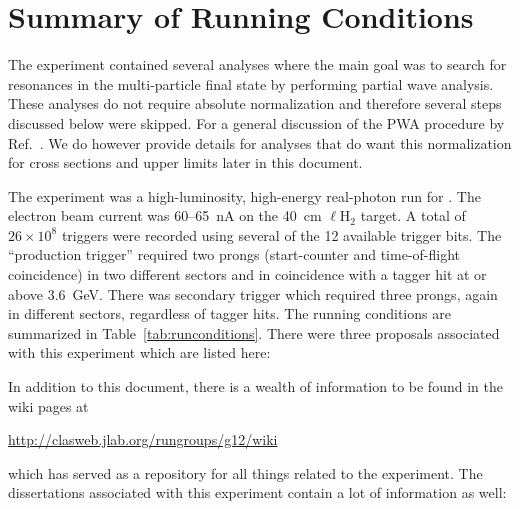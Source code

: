 \section{Summary of Running Conditions}

The  experiment contained several analyses where the main goal was to search for resonances in the multi-particle final state by performing partial wave analysis. These analyses\cite{clas.thesis.bookwalter, clas.thesis.schott} do not require absolute normalization and therefore several steps discussed below were skipped. For a general discussion of the PWA procedure by  Ref.~\cite{pwa.salgado2014}. We do however provide details for analyses that do want this normalization for cross sections and upper limits later in this document.

The  experiment was a high-luminosity, high-energy real-photon run for . The electron beam current was 60--65~nA on the 40~cm $\ell$H$_2$ target. A total of $26\times 10^8$ triggers were recorded using several of the 12 available trigger bits. The ``production trigger'' required two prongs (start-counter and time-of-flight coincidence) in two different sectors and in coincidence with a tagger hit at or above 3.6~GeV. There was secondary trigger which required three prongs, again in different sectors, regardless of tagger hits. The running conditions are summarized in Table~\ref{tab:runconditions}. There were three proposals associated with this experiment which are listed here:

In addition to this document, there is a wealth of information to be found in the wiki pages at
\begin{center}
    \url{http://clasweb.jlab.org/rungroups/g12/wiki}
\end{center}
which has served as a repository for all things related to the  experiment. The dissertations associated with this experiment contain a lot of information as well:







